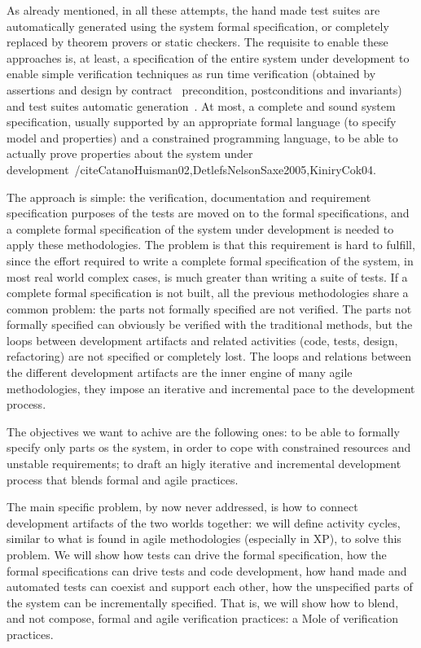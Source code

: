 \documentclass{article}
\begin{document}
As already mentioned, in all these attempts, the hand made test suites are automatically generated using the system formal specification, or completely replaced by theorem provers or static checkers. 
The requisite to enable these approaches is, at least, a specification of the entire system under development to enable simple verification techniques as run time verification (obtained by assertions and design by contract~\cite{Meyer1997} precondition, postconditions and invariants) and test suites automatic generation~\cite{Cheon2002,Cheon2004,Cheon2005}.
At most, a complete and sound system specification, usually supported by an appropriate formal language (to specify model and properties) and a constrained programming language, to be able to actually prove properties about the system under development~/cite{CatanoHuisman02,DetlefsNelsonSaxe2005,KiniryCok04}.

The approach is simple: the verification, documentation and requirement specification purposes of the tests are moved on to the formal specifications, and a complete formal specification of the system under development is needed to apply these methodologies.
The problem is that this requirement is hard to fulfill, since the effort required to write a complete formal specification of the system, in most real world complex cases, is much greater than writing a suite of tests.
If a complete formal specification is not built, all the previous methodologies share a common problem: the parts not formally specified are not verified.
The parts not formally specified can obviously be verified with the traditional methods, but the loops between development artifacts and related activities (code, tests, design, refactoring) are not specified or completely lost.
The loops and relations between the different development artifacts are the inner engine of many agile methodologies, they impose an iterative and incremental pace to the development process.

The objectives we want to achive are the following ones: to be able to formally specify only parts os the system, in order to cope with constrained resources and unstable requirements; to draft an higly iterative and incremental development process that blends formal and agile practices.

The main specific problem, by now never addressed, is how to connect development artifacts of the two worlds together: we will define activity cycles, similar to what is found in agile methodologies (especially in XP), to solve this problem.
We will show how tests can drive the formal specification, how the formal specifications can drive tests and code development, how hand made and automated tests can coexist and support each other, how the unspecified parts of the system can be incrementally specified.
That is, we will show how to blend, and not compose, formal and agile verification practices: a Mole of verification practices.
\end{document}
